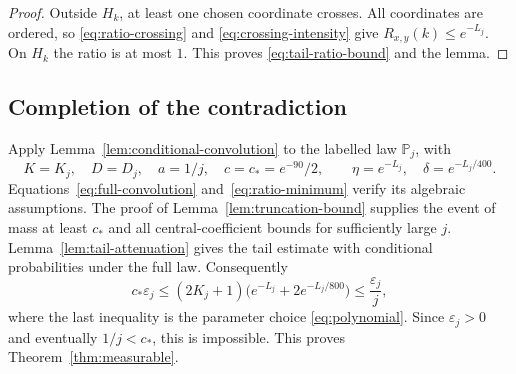\begin{proof}
Outside $H_k$, at least one chosen coordinate crosses. All coordinates
are ordered, so \eqref{eq:ratio-crossing} and
\eqref{eq:crossing-intensity} give $R_{x,y}(k)\le e^{-L_j}$.
On $H_k$ the ratio is at most $1$. This proves
\eqref{eq:tail-ratio-bound} and the lemma.
\end{proof}

\subsection{Completion of the contradiction}

Apply Lemma~\ref{lem:conditional-convolution} to the labelled law
$\mathbb P_j$, with
\[
 K=K_j,\quad D=D_j,\quad a=1/j,\quad c=c_* =e^{-90}/2,
 \qquad \eta=e^{-L_j},\quad \delta=e^{-L_j/400}.
\]
Equations~\eqref{eq:full-convolution} and~\eqref{eq:ratio-minimum}
verify its algebraic assumptions.  The proof of
Lemma~\ref{lem:truncation-bound} supplies the event of mass at least
$c_*$ and all central-coefficient bounds for sufficiently large $j$.
Lemma~\ref{lem:tail-attenuation} gives the tail estimate with conditional
probabilities under the full law.  Consequently
\[
 c_*\varepsilon_j
 \le(2K_j+1)\bigl(e^{-L_j}+2e^{-L_j/800}\bigr)
 \le\frac{\varepsilon_j}{j},
\]
where the last inequality is the parameter choice
\eqref{eq:polynomial}.  Since $\varepsilon_j>0$ and eventually
$1/j<c_*$, this is impossible.  This proves
Theorem~\ref{thm:measurable}.
